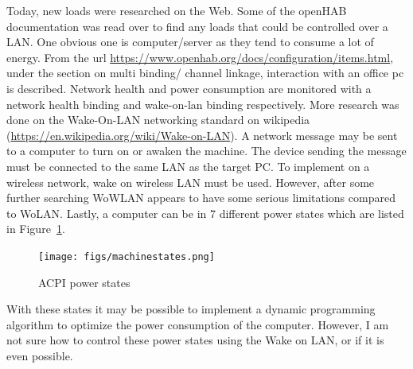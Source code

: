 \documentclass[fontsize=11pt, %
                             paper=letter, %
                             twoside, %
                             captions=tableheading,
                             index=totoc,
                             hyperref]{labbook}
\begin{document}
\begin{addmargin}[0cm]{0cm}
Today, new loads were researched on the Web. Some of the openHAB documentation was read over to find any loads that could be controlled over a LAN. One obvious one is computer/server as they tend to consume a lot of energy. From the url \url{https://www.openhab.org/docs/configuration/items.html}, under the section on multi binding/ channel linkage, interaction with an office pc is described. Network health and power consumption are monitored with a network health binding and wake-on-lan binding respectively.
\smallbreak\noindent
More research was done on the Wake-On-LAN networking standard on wikipedia (\url{https://en.wikipedia.org/wiki/Wake-on-LAN}). A network message may be sent to a computer to turn on or awaken the machine. The device sending the message must be connected to the same LAN as the target PC. To implement on a wireless network, wake on wireless LAN must be used. However, after some further searching WoWLAN appears to have some serious limitations compared to WoLAN. Lastly, a computer can be in 7 different power states which are listed in Figure~\ref{figs:powerstates}.
\begin{figure}[H]
\centering
\texttt{[image: figs/machinestates.png]}
\caption{ACPI power states}
\label{figs:powerstates}
\end{figure} 
With these states it may be possible to implement a dynamic programming algorithm to optimize the power consumption of the computer. However, I am not sure how to control these power states using the Wake on LAN, or if it is even possible.
\end{addmargin}









\end{document}
